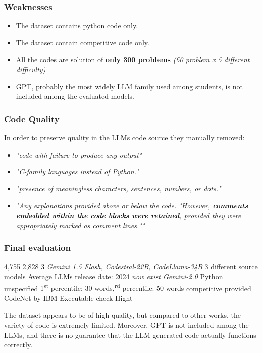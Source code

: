 \subsubsection*{Weaknesses}
\begin{itemize}
    \item The dataset contains python code only.
    \item The dataset contain competitive code only.
    \item All the codes are solution of \textbf{only 300 problems} 
    \textit{(60 problem x 5 different difficulty)}
    \item GPT, probably the most widely LLM family 
    used among students, is not 
    included among the evaluated models.
\end{itemize}


\subsubsection*{Code Quality}
In order to preserve quality in the LLMs code source they manually removed:
\begin{itemize}
    \item \textit{"code with failure to produce any output"}
    \item \textit{"C-family languages instead of Python."}
    \item \textit{"presence of meaningless characters, sentences, numbers, or dots."}
    \item \textit{"Any explanations provided above or below the code.
    "However, \textbf{comments embedded within the code blocks were retained}, provided they were 
    appropriately marked as comment lines.""}
\end{itemize}


\subsubsection*{Final evaluation}


\expandafter\def\csname AIGCodeSetHumanCode\endcsname{4,755}
\expandafter\def\csname AIGCodeSetLLMCode\endcsname{2,828}
\expandafter\def\csname AIGCodeSetNumLLMs\endcsname{3 \textit{Gemini 1.5 Flash, Codestral-22B, CodeLlama-34B}}
\expandafter\def\csname AIGCodeSetLLMDiversity\endcsname{3 different source models}
\expandafter\def\csname AIGCodeSetCurrentUse\endcsname{Average LLMs release date: 2024 \textit{now exist Gemini-2.0}}
\expandafter\def\csname AIGCodeSetLanguages\endcsname{Python}
\expandafter\def\csname AIGCodeSetCodeTypes\endcsname{unspecified}
\expandafter\def\csname AIGCodeSetCodeSize\endcsname{1\textsuperscript{st} percentile: 30 words,\textsuperscript{rd} percentile: 50 words}
\expandafter\def\csname AIGCodeSetCodeContext\endcsname{competitive}
\expandafter\def\csname AIGCodeSetPrompts\endcsname{provided}
\expandafter\def\csname AIGCodeSetSources\endcsname{CodeNet by IBM \cite{puri2021codenet}}
\expandafter\def\csname AIGCodeSetCodeQuality\endcsname{Executable check}
\expandafter\def\csname AIGCodeSetReliability\endcsname{Hight}




The dataset appears to be of high quality, but compared to other works, 
the variety of code is extremely limited.
Moreover, GPT is not included among the LLMs, and there is no guarantee that 
the LLM-generated code actually functions correctly.